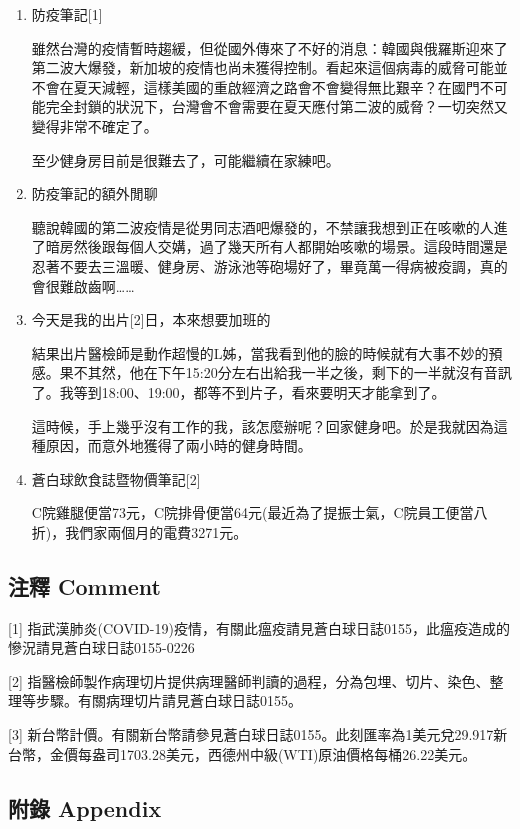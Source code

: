\documentclass[a5paper, 12pt
]{book}
\begin{document}
\begin{enumerate}
\def\labelenumi{\arabic{enumi}.}
\item
  防疫筆記{[}1{]}

  雖然台灣的疫情暫時趨緩，但從國外傳來了不好的消息：韓國與俄羅斯迎來了第二波大爆發，新加坡的疫情也尚未獲得控制。看起來這個病毒的威脅可能並不會在夏天減輕，這樣美國的重啟經濟之路會不會變得無比艱辛？在國門不可能完全封鎖的狀況下，台灣會不會需要在夏天應付第二波的威脅？一切突然又變得非常不確定了。

  至少健身房目前是很難去了，可能繼續在家練吧。
\item
  防疫筆記的額外閒聊

  聽說韓國的第二波疫情是從男同志酒吧爆發的，不禁讓我想到正在咳嗽的人進了暗房然後跟每個人交媾，過了幾天所有人都開始咳嗽的場景。這段時間還是忍著不要去三溫暖、健身房、游泳池等砲場好了，畢竟萬一得病被疫調，真的會很難啟齒啊\ldots\ldots{}
\item
  今天是我的出片{[}2{]}日，本來想要加班的

  結果出片醫檢師是動作超慢的L姊，當我看到他的臉的時候就有大事不妙的預感。果不其然，他在下午15:20分左右出給我一半之後，剩下的一半就沒有音訊了。我等到18:00、19:00，都等不到片子，看來要明天才能拿到了。

  這時候，手上幾乎沒有工作的我，該怎麼辦呢？回家健身吧。於是我就因為這種原因，而意外地獲得了兩小時的健身時間。
\item
  蒼白球飲食誌暨物價筆記{[}2{]}

  C院雞腿便當73元，C院排骨便當64元(最近為了提振士氣，C院員工便當八折)，我們家兩個月的電費3271元。
\end{enumerate}

\hypertarget{ux6ce8ux91cb-comment-71}{%
\subsection{注釋 Comment}\label{ux6ce8ux91cb-comment-71}}

{[}1{]}
指武漢肺炎(COVID-19)疫情，有關此瘟疫請見蒼白球日誌0155，此瘟疫造成的慘況請見蒼白球日誌0155-0226

{[}2{]}
指醫檢師製作病理切片提供病理醫師判讀的過程，分為包埋、切片、染色、整理等步驟。有關病理切片請見蒼白球日誌0155。

{[}3{]}
新台幣計價。有關新台幣請參見蒼白球日誌0155。此刻匯率為1美元兌29.917新台幣，金價每盎司1703.28美元，西德州中級(WTI)原油價格每桶26.22美元。

\hypertarget{ux9644ux9304-appendix-71}{%
\subsection{附錄 Appendix}\label{ux9644ux9304-appendix-71}}
\end{document}
